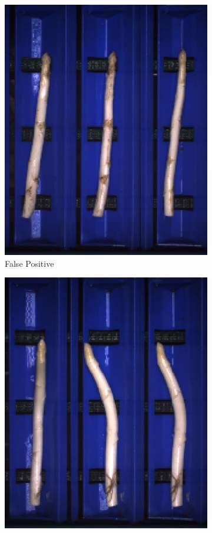 \begin{figure}[h]
	\begin{subfigure}{0.3\textwidth}
		\includegraphics[width=0.9\linewidth]{Figures/appendix/fractured_falsepositive_01.png}
		\vspace{-5pt}
		\caption{False Positive}
	\end{subfigure}
	\begin{subfigure}{0.3\textwidth}
		\includegraphics[width=0.9\linewidth]{Figures/appendix/fractured_falsepositive_02.png}

\end{subfigure}
\end{figure}

